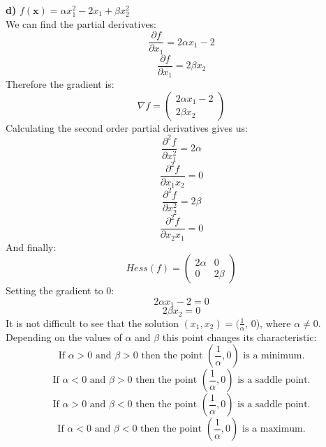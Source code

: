 \documentclass{article}
\begin{document}
\textbf{d)} $f(\boldsymbol{x}) = \alpha x_1^2 - 2x_1 + \beta x_2^2$\\
We can find the partial derivatives:
\begin{equation*}
    \frac{\partial f}{\partial x_1} = 2\alpha x_1 - 2
\end{equation*}
\begin{equation*}
    \frac{\partial f}{\partial x_1} = 2\beta x_2
\end{equation*}
Therefore the gradient is:
\begin{equation*}
    \nabla f = \begin{pmatrix} 2\alpha x_1 - 2\\ 2\beta x_2\end{pmatrix}
\end{equation*}
Calculating the second order partial derivatives gives us:
\begin{equation*}
    \frac{\partial ^2 f}{\partial x_1^2} = 2\alpha
\end{equation*}
\begin{equation*}
    \frac{\partial ^2 f}{\partial x_1x_2} = 0
\end{equation*}
\begin{equation*}
    \frac{\partial ^2 f}{\partial x_2^2} = 2\beta
\end{equation*}
\begin{equation*}
    \frac{\partial ^2 f}{\partial x_2x_1} = 0
\end{equation*}
And finally:
\begin{equation*}
    Hess(f) = \begin{pmatrix} 2\alpha & 0\\ 0 & 2\beta \end{pmatrix}
\end{equation*}
Setting the gradient to 0:
\begin{equation*}
    2\alpha x_1 - 2 = 0 
\end{equation*}
\begin{equation*}
    2\beta x_2 = 0
\end{equation*}
It is not difficult to see that the solution $(x_1,x_2) = (\frac{1}{\alpha}$, 0), where $\alpha \neq 0$. Depending on the values of $\alpha$ and $\beta$ this point changes its characteristic:
\begin{equation*}
    \text{If } \alpha > 0 \text{ and } \beta > 0 \text{ then the point } (\frac{1}{\alpha}, 0) \text{ is a minimum.}
\end{equation*}
\begin{equation*}
    \text{If } \alpha < 0 \text{ and } \beta > 0 \text{ then the point } (\frac{1}{\alpha}, 0) \text{ is a saddle point.}
\end{equation*}
\begin{equation*}
    \text{If } \alpha > 0 \text{ and } \beta < 0 \text{ then the point } (\frac{1}{\alpha}, 0) \text{ is a saddle point.}
\end{equation*}
\begin{equation*}
    \text{If } \alpha < 0 \text{ and } \beta < 0 \text{ then the point } (\frac{1}{\alpha}, 0) \text{ is a maximum.}
\end{equation*}
\end{document}

